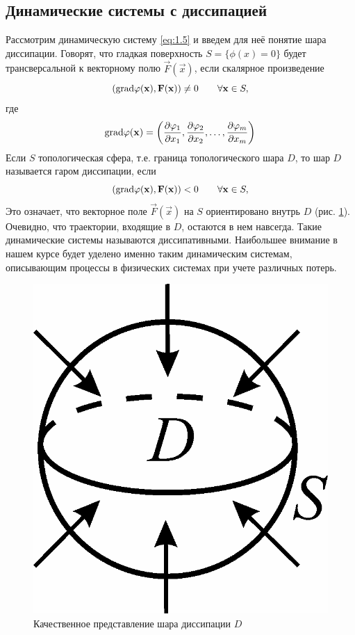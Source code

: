 \subsection{Динамические системы с диссипацией} %
Рассмотрим динамическую систему \eqref{eq:1.5}  и введем для неё понятие шара диссипации. Говорят, что гладкая поверхность $S=\{\phi(x) = 0 \}$ будет трансверсальной к векторному полю $\vec F (\vec x) $, если скалярное произведение
\begin{equation}
	\qty(\textrm{grad} \varphi(\mathbf x), \mathbf F(\mathbf x)) \neq 0 \qquad \forall \mathbf x \in S,
\end{equation}
где 
\begin{equation}
	\textrm{grad} \varphi(\mathbf x) = \qty(\pdv{\varphi_1}{x_1},\pdv{\varphi_2}{x_2},\dots, \pdv{\varphi_m}{x_m})
\end{equation}
Если $S$ топологическая сфера, т.е. граница топологического шара $D$, то шар $D$ называется гаром диссипации, если
\begin{equation}
	\qty(\textrm{grad} \varphi(\mathbf x), \mathbf F(\mathbf x)) < 0 \qquad \forall \mathbf x \in S,
\end{equation}
Это означает, что векторное поле $\vec F(\vec x)$ на $S$ ориентировано внутрь $D$ (рис. \ref{fig:1.2}). Очевидно, что траектории, входящие в $D$, остаются в нем навсегда. Такие динамические системы называются диссипативными. Наибольшее внимание в нашем курсе будет уделено именно таким динамическим системам, описывающим процессы в физических системах при учете различных потерь. 

\begin{figure}[h!]
	\centering
	\includegraphics[]{fig/lect1/2}
	\caption{Качественное представление шара диссипации $D$}
	\label{fig:1.2}
\end{figure}


